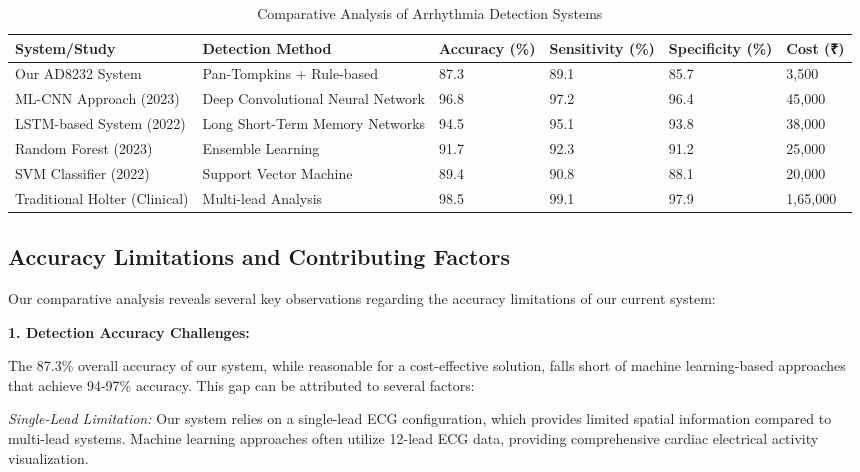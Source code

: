 \documentclass[12pt,a4paper]{article}
\begin{document}
\begin{table}[h]
\centering
\caption{Comparative Analysis of Arrhythmia Detection Systems}
\begin{tabular}{|p{2.5cm}|p{2cm}|p{2cm}|p{2cm}|p{2cm}|p{2cm}|}
\hline
\textbf{System/Study} & \textbf{Detection Method} & \textbf{Accuracy (\%)} & \textbf{Sensitivity (\%)} & \textbf{Specificity (\%)} & \textbf{Cost (₹)} \\
\hline
Our AD8232 System & Pan-Tompkins + Rule-based & 87.3 & 89.1 & 85.7 & 3,500 \\
\hline
ML-CNN Approach (2023)\cite{cnn2023} & Deep Convolutional Neural Network & 96.8 & 97.2 & 96.4 & 45,000 \\
\hline
LSTM-based System (2022)\cite{lstm2022} & Long Short-Term Memory Networks & 94.5 & 95.1 & 93.8 & 38,000 \\
\hline
Random Forest (2023)\cite{rf2023} & Ensemble Learning & 91.7 & 92.3 & 91.2 & 25,000 \\
\hline
SVM Classifier (2022)\cite{svm2022} & Support Vector Machine & 89.4 & 90.8 & 88.1 & 20,000 \\
\hline
Traditional Holter (Clinical) & Multi-lead Analysis & 98.5 & 99.1 & 97.9 & 1,65,000 \\
\hline
\end{tabular}
\end{table}

\subsection{Accuracy Limitations and Contributing Factors}

Our comparative analysis reveals several key observations regarding the accuracy limitations of our current system:

\vspace{0.5cm}

\textbf{1. Detection Accuracy Challenges:}

The 87.3\% overall accuracy of our system, while reasonable for a cost-effective solution, falls short of machine learning-based approaches that achieve 94-97\% accuracy. This gap can be attributed to several factors:

\vspace{0.3cm}

\textit{Single-Lead Limitation:} Our system relies on a single-lead ECG configuration, which provides limited spatial information compared to multi-lead systems. Machine learning approaches often utilize 12-lead ECG data, providing comprehensive cardiac electrical activity visualization.
\end{document}
